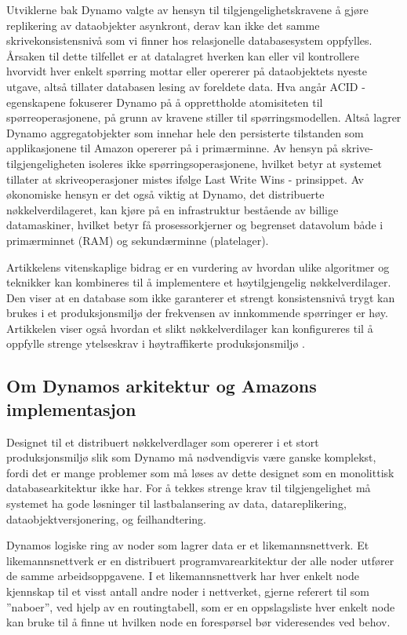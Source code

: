 Utviklerne bak Dynamo valgte av hensyn til tilgjengelighetskravene å gjøre replikering av dataobjekter asynkront, derav kan ikke det samme skrivekonsistensnivå som vi finner hos relasjonelle databasesystem oppfylles. Årsaken til dette tilfellet er at datalagret hverken kan eller vil kontrollere hvorvidt hver enkelt spørring mottar eller opererer på dataobjektets nyeste utgave, altså tillater databasen lesing av foreldete data. Hva angår ACID - egenskapene fokuserer Dynamo på å opprettholde atomisiteten til spørreoperasjonene, på grunn av kravene \cite{decandia2007} stiller til spørringsmodellen. Altså lagrer Dynamo aggregatobjekter som innehar hele den persisterte tilstanden som applikasjonene til Amazon opererer på i primærminne. Av hensyn på skrive-tilgjengeligheten isoleres ikke spørringsoperasjonene, hvilket betyr at systemet tillater at skriveoperasjoner mistes ifølge Last Write Wins - prinsippet. Av økonomiske hensyn er det også viktig at Dynamo, det distribuerte nøkkelverdilageret, kan kjøre på en infrastruktur bestående av billige datamaskiner, hvilket betyr få prosessorkjerner og begrenset datavolum både i primærminnet (RAM) og sekundærminne (platelager).

Artikkelens vitenskaplige bidrag er en vurdering av hvordan ulike algoritmer og teknikker kan kombineres til å implementere et høytilgjengelig nøkkelverdilager. Den viser at en database som ikke garanterer et strengt konsistensnivå trygt kan brukes i et produksjonsmiljø der frekvensen av innkommende spørringer er høy. Artikkelen viser også hvordan et slikt nøkkelverdilager kan konfigureres til å oppfylle strenge ytelseskrav i høytraffikerte produksjonsmiljø \citep{decandia2007}.

\subsection{Om Dynamos arkitektur og Amazons implementasjon} \label{dynark}

Designet til et distribuert nøkkelverdlager som opererer i et stort produksjonsmiljø slik som Dynamo må nødvendigvis være ganske komplekst, fordi det er mange problemer som må løses av dette designet som en monolittisk databasearkitektur ikke har. For å tekkes strenge krav til tilgjengelighet må systemet ha gode løsninger til lastbalansering av data, datareplikering, dataobjektversjonering, og feilhandtering.

Dynamos logiske ring av noder som lagrer data er et likemannsnettverk. Et likemannsnettverk er en distribuert programvarearkitektur der alle noder utfører de samme arbeidsoppgavene. I et likemannsnettverk har hver enkelt node kjennskap til et visst antall andre noder i nettverket, gjerne referert til som ''naboer'', ved hjelp av en routingtabell, som er en oppslagsliste hver enkelt node kan bruke til å finne ut hvilken node en forespørsel bør videresendes ved behov.

